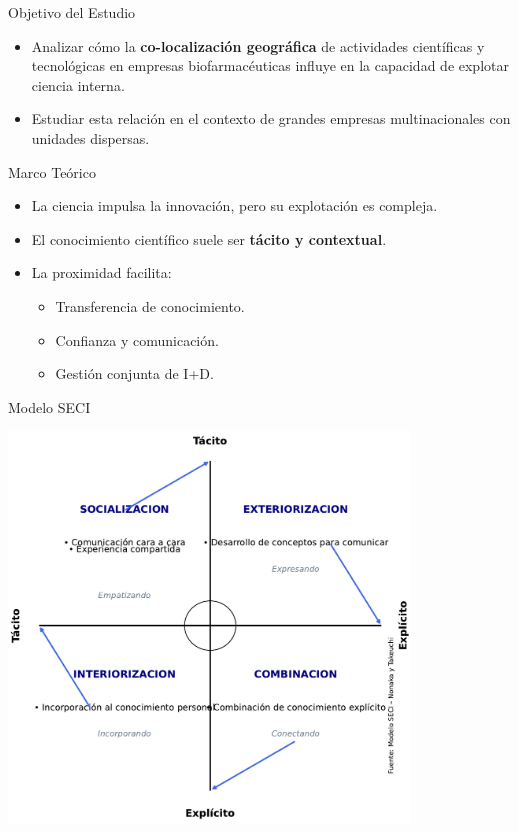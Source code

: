\documentclass{beamer}
\begin{document}
	\begin{frame}{Objetivo del Estudio}
		\begin{itemize}
			\item Analizar cómo la \textbf{co-localización geográfica} de actividades científicas y tecnológicas en empresas biofarmacéuticas influye en la capacidad de explotar ciencia interna.
			\item Estudiar esta relación en el contexto de grandes empresas multinacionales con unidades dispersas.
		\end{itemize}
	\end{frame}
	
	\begin{frame}{Marco Teórico}
		\begin{itemize}
			\item La ciencia impulsa la innovación, pero su explotación es compleja.
			\item El conocimiento científico suele ser \textbf{tácito y contextual}.
			\item La proximidad facilita:
			\begin{itemize}
				\item Transferencia de conocimiento.
				\item Confianza y comunicación.
				\item Gestión conjunta de I+D.
			\end{itemize}
		\end{itemize}
	\end{frame}
	\begin{frame}{Modelo SECI}
		\centering
		\begin{minipage}{0.85\textwidth}
			\includegraphics[width=0.8\textwidth]{./figs/Nonaka.pdf}
		\end{minipage}%
		\begin{minipage}{0.05\textwidth}
			\centering
		\end{minipage}
	\end{frame}
	
\end{document}
